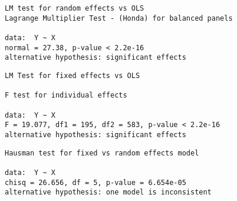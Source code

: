 \documentclass{article}
\begin{document}
\newpage
\begin{verbatim}
LM test for random effects vs OLS
Lagrange Multiplier Test - (Honda) for balanced panels

data:  Y ~ X
normal = 27.38, p-value < 2.2e-16
alternative hypothesis: significant effects
\end{verbatim}

\begin{verbatim}
LM Test for fixed effects vs OLS

F test for individual effects

data:  Y ~ X
F = 19.077, df1 = 195, df2 = 583, p-value < 2.2e-16
alternative hypothesis: significant effects
\end{verbatim}

\begin{verbatim}
Hausman test for fixed vs random effects model

data:  Y ~ X
chisq = 26.656, df = 5, p-value = 6.654e-05
alternative hypothesis: one model is inconsistent
\end{verbatim}


\newpage
\end{document}
